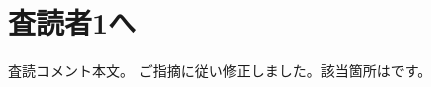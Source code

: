 \documentclass{jsarticle}
\begin{document}
\section*{査読者1へ}
\Comment
査読コメント本文。
\Reply
ご指摘に従い修正しました。該当箇所はです。
\end{document}
